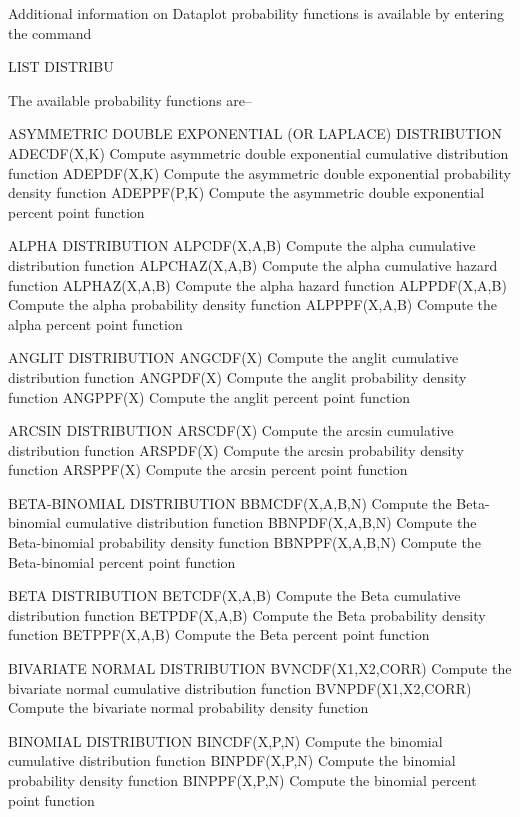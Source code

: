 Additional information on Dataplot probability functions is
available by entering the command

     LIST DISTRIBU

The available probability functions are--
 
ASYMMETRIC DOUBLE EXPONENTIAL (OR LAPLACE) DISTRIBUTION
   ADECDF(X,K)        Compute asymmetric double exponential cumulative
                      distribution function
   ADEPDF(X,K)        Compute the asymmetric double exponential
                      probability density function
   ADEPPF(P,K)        Compute the asymmetric double exponential
                      percent point function

ALPHA DISTRIBUTION
   ALPCDF(X,A,B)      Compute the alpha cumulative distribution function
   ALPCHAZ(X,A,B)     Compute the alpha cumulative hazard function
   ALPHAZ(X,A,B)      Compute the alpha hazard function
   ALPPDF(X,A,B)      Compute the alpha probability density function
   ALPPPF(X,A,B)      Compute the alpha percent point function
 
ANGLIT DISTRIBUTION
   ANGCDF(X)          Compute the anglit cumulative distribution function
   ANGPDF(X)          Compute the anglit probability density function
   ANGPPF(X)          Compute the anglit percent point function
 
ARCSIN DISTRIBUTION
   ARSCDF(X)          Compute the arcsin cumulative distribution function
   ARSPDF(X)          Compute the arcsin probability density function
   ARSPPF(X)          Compute the arcsin percent point function
 
BETA-BINOMIAL DISTRIBUTION
   BBMCDF(X,A,B,N)    Compute the Beta-binomial cumulative
                      distribution function
   BBNPDF(X,A,B,N)    Compute the Beta-binomial probability density
                      function
   BBNPPF(X,A,B,N)    Compute the Beta-binomial percent point function
 
BETA DISTRIBUTION
   BETCDF(X,A,B)      Compute the Beta cumulative distribution function
   BETPDF(X,A,B)      Compute the Beta probability density function
   BETPPF(X,A,B)      Compute the Beta percent point function
 
BIVARIATE NORMAL DISTRIBUTION
   BVNCDF(X1,X2,CORR) Compute the bivariate normal cumulative
                      distribution function
   BVNPDF(X1,X2,CORR) Compute the bivariate normal probability density
                      function

BINOMIAL DISTRIBUTION
   BINCDF(X,P,N)      Compute the binomial cumulative distribution
                      function
   BINPDF(X,P,N)      Compute the binomial probability density function
   BINPPF(X,P,N)      Compute the binomial percent point function
 

